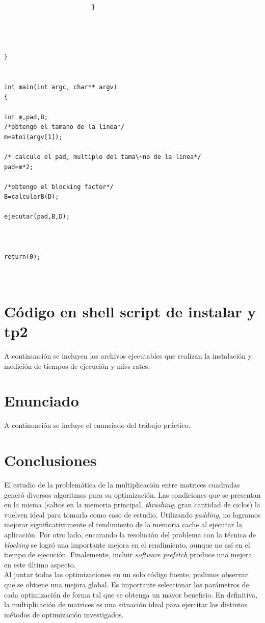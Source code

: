 \documentclass[a4paper,10pt]{article}
\begin{document}
\begin{verbatim}
                        }




}


int main(int argc, char** argv)
{

int m,pad,B;
/*obtengo el tamano de la linea*/
m=atoi(argv[1]);

/* calculo el pad, multiplo del tama\~no de la linea*/
pad=m*2;

/*obtengo el blocking factor*/
B=calcularB(D);

ejecutar(pad,B,D);



return(0);



\end{verbatim}



\section{C\'odigo en shell script de instalar y tp2} 

A continuaci\'on se incluyen los  archivos ejecutables que realizan la instalaci\'on y medici\'on de tiempos de ejecuci\'on y miss rates.

\pagebreak


\section{Enunciado} 

A continuaci\'on se incluye el enunciado del tr\'abajo pr\'actico.
\pagebreak

\section{Conclusiones}

El estudio de la problem\'atica de la multiplicaci\'on entre matrices cuadradas gener\'o diversos algoritmos para su optimizaci\'on. Las condiciones que se presentan en la misma (saltos en la memoria principal, \textit{thrashing}, gran cantidad de ciclos) la vuelven ideal para tomarla como caso de estudio. Utilizando \textit{padding}, no logramos mejorar significativamente el rendimiento de la memoria cache al ejecutar la aplicaci\'on. Por otro lado, encarando la resoluci\'on del problema con la t\'ecnica de \textit{blocking} se logr\'o una importante mejora en el rendimiento, aunque no as\'i en el tiempo de ejecuci\'on. 
Finalemente, incluir \textit{software prefetch}  produce una mejora en este \'ultimo aspecto.\\
Al juntar todas las optimizaciones en un solo c\'odigo fuente, pudimos observar que se obtiene una mejora global. Es importante seleccionar los par\'ametros de cada optimizaci\'on de forma tal que se obtenga un mayor beneficio.
En definitiva, la multiplicaci\'on de matrices es una situaci\'on ideal para ejercitar los distintos m\'etodos de optimizaci\'on investigados.\\
\end{document}
